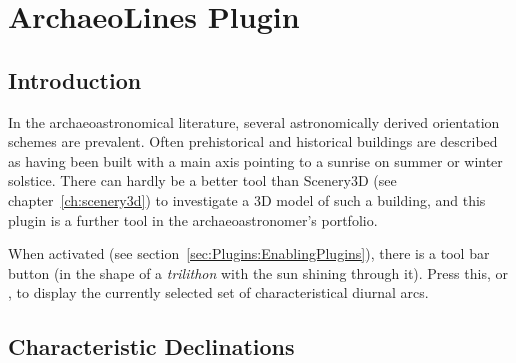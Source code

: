 

% 
% 
% 
\newpage
\section{ArchaeoLines Plugin}
\label{sec:plugin:ArchaeoLines}

\subsection{Introduction}
\label{sec:plugin:ArchaeoLines:Introduction}

In the archaeoastronomical literature, several astronomically derived
orientation schemes are prevalent. Often prehistorical and historical
buildings are described as having been built with a main axis pointing
to a sunrise on summer or winter solstice. There can hardly be a
better tool than Scenery3D (see chapter~\ref{ch:scenery3d}) to investigate a 3D model of such a
building, and this plugin is a further tool in the archaeoastronomer's
portfolio.

When activated (see section~\ref{sec:Plugins:EnablingPlugins}), there
is a tool bar button  (in the
shape of a \emph{trilithon} with the sun shining through it). Press
this, or , to display the currently selected set of
characteristical diurnal arcs.

\subsection{Characteristic Declinations}
\label{sec:plugin:ArchaeoLines:Declinations}


